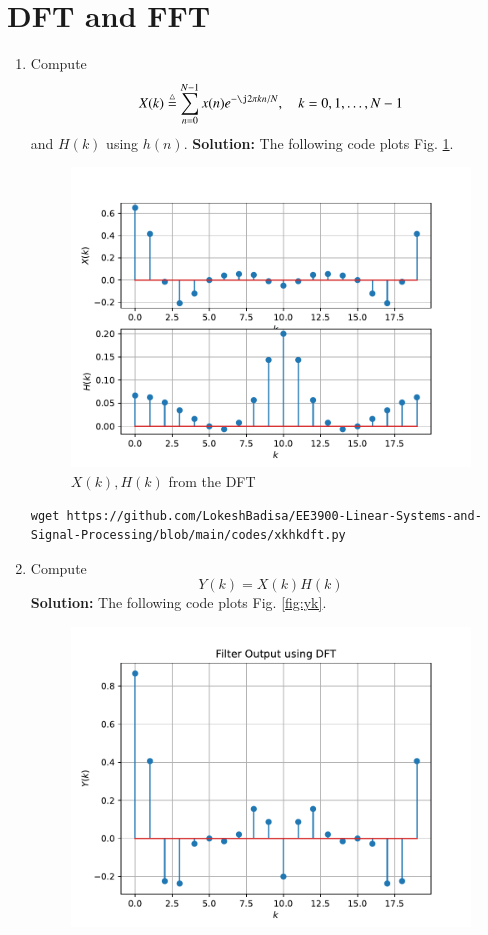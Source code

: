 \documentclass[journal,12pt,twocolumn]{IEEEtran}
\newcommand{\solution}{\noindent \textbf{Solution: }}
\numberwithin{equation}{section}
\renewcommand\thesection{\arabic{section}}
\newcommand{\define}{\stackrel{\triangle}{=}}
\begin{document}
\section{DFT and FFT}
\begin{enumerate}[label=\thesection.\arabic*]
\item
Compute
\begin{equation}
X(k) \define \sum _{n=0}^{N-1}x(n) e^{-\j2\pi kn/N}, \quad k = 0,1,\dots, N-1
\end{equation}
and $H(k)$ using $h(n)$.
\solution The following code plots Fig. \ref{fig:xkhk}. 
\begin{figure}[!ht]
\centering
\includegraphics[width=\columnwidth]{./figs/xkhk}
\caption{$X(k) ,H(k)$ from the DFT}
\label{fig:xkhk}
\end{figure}
\begin{lstlisting}
wget https://github.com/LokeshBadisa/EE3900-Linear-Systems-and-Signal-Processing/blob/main/codes/xkhkdft.py
\end{lstlisting}
\item Compute 
\begin{equation}
Y(k) = X(k)H(k)
\end{equation}
\solution The following code plots Fig. \ref{fig:yk}. 
\begin{figure}[!ht]
\centering
\includegraphics[width=\columnwidth]{./figs/yk}

\end{figure}
\end{enumerate}
\end{document}
